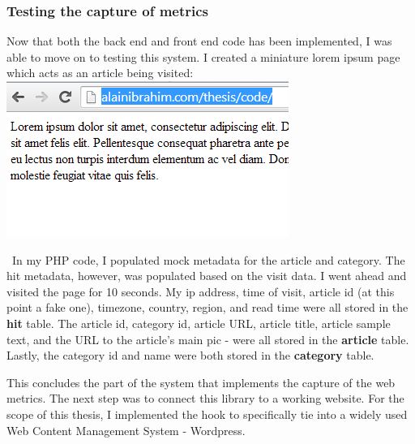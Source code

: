 \documentclass[12pt]{article}
\begin{document}
{\newpage

\subsubsection{Testing the capture of metrics}
Now that both the back end and front end code has been implemented, I was able to move on to testing this system. I created a miniature lorem ipsum page which acts as an article being visited: \\

\noindent\includegraphics[scale=1]{img/visit1}

\noindent\ In my PHP code, I populated mock metadata for the article and category. The hit metadata, however, was populated based on the visit data. I went ahead and visited the page for 10 seconds. My ip address, time of visit, article id (at this point a fake one), timezone, country, region, and read time were all stored in the \textbf{hit} table. The article id, category id, article URL, article title, article sample text, and the URL to the article's main pic - were all stored in the \textbf{article} table. Lastly, the category id and name were both stored in the \textbf{category} table.

This concludes the part of the system that implements the capture of the web metrics. The next step was to connect this library to a working website. For the scope of this thesis, I implemented the hook to specifically tie into a widely used Web Content Management System - Wordpress. 

\newpage

}
\end{document}
